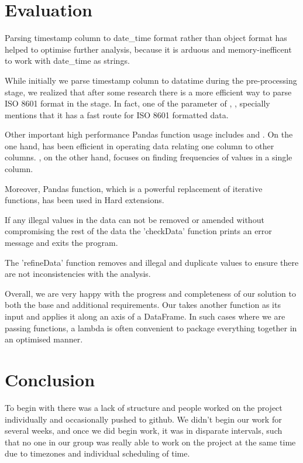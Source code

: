 \documentclass[12pt,a4paper,final]{article}
\begin{document}
\section*{Evaluation}
Parsing timestamp column to date\_time format rather than object format has helped to optimise further analysis, because it is arduous and memory-inefficent to work with date\_time as strings.

While initially we parse timestamp column to datatime during the pre-processing stage, we realized that after some research there is a more efficient way to parse ISO 8601 format in the  stage.
In fact, one of the parameter of , , specially mentions that it has a fast route for ISO 8601 formatted data.

Other important high performance Pandas function usage includes  and . On the one hand,  has been efficient in operating data relating one column to other columns.
, on the other hand, focuses on finding frequencies of values in a single column.

Moreover, Pandas  function, which is a powerful replacement of iterative functions, has been used in Hard extensions.

If any illegal values in the data can not be removed or amended without compromising the rest of the data the 'checkData' function prints an error message and exits the program.

The 'refineData' function removes and illegal and duplicate values to ensure there are not inconsistencies with the analysis.

Overall, we are very happy with the progress and completeness of our solution to both the base and additional requirements. Our  takes another function as its input and applies it along an axis of a DataFrame.
In such cases where we are passing functions, a lambda is often convenient to package everything together in an optimised manner.

\section*{Conclusion}

To begin with there was a lack of structure and people worked on the project individually and occasionally pushed to github. We didn't begin our work for several weeks, and once we did begin work, it was in disparate intervals, such that no one in our group was really able to work on the project at the same time due to timezones and individual scheduling of time.
\end{document}
